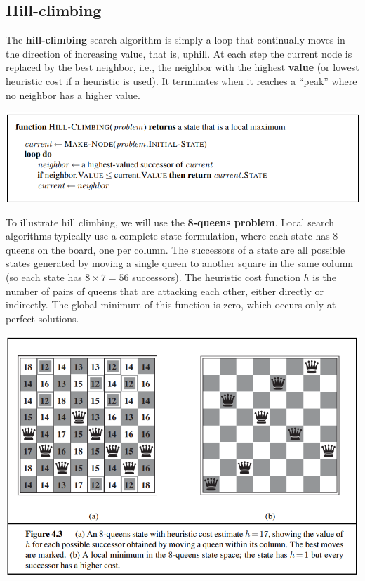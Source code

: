 \subsection{Hill-climbing}
The \textbf{hill-climbing} search algorithm is simply a loop that continually moves in the direction of increasing value, that is, uphill. At each step the current node is replaced by the best neighbor, i.e., the neighbor with the highest \textbf{value} (or lowest heuristic cost if a heuristic is used). It terminates when it reaches a “peak” where no neighbor has a higher value.
\begin{center}
    \includegraphics[]{images/hill-climbing.png}
\end{center}
To illustrate hill climbing, we will use the \textbf{8-queens problem}. Local search algorithms typically use a complete-state formulation, where each state has 8 queens on the board, one per column. The successors of a state are all possible states generated by moving a single queen to another square in the same column (so each state has $8 \times 7 = 56$ successors). The heuristic cost function $h$ is the number of pairs of queens that
are attacking each other, either directly or indirectly. The global minimum of this function is zero, which occurs only at perfect solutions.
\begin{center}
    \includegraphics[scale=0.8]{images/8-queens.png}
\end{center}
